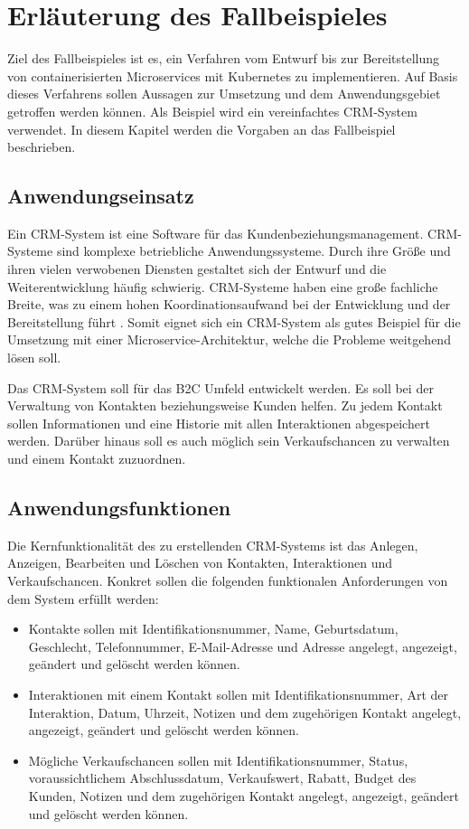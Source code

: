 \section{Erläuterung des Fallbeispieles}
Ziel des Fallbeispieles ist es, ein Verfahren vom Entwurf bis zur Bereitstellung von containerisierten Microservices mit Kubernetes zu implementieren. Auf Basis dieses Verfahrens sollen Aussagen zur Umsetzung und dem Anwendungsgebiet getroffen werden können. Als Beispiel wird ein vereinfachtes \ac{CRM}-System verwendet. In diesem Kapitel werden die Vorgaben an das Fallbeispiel beschrieben.

\subsection{Anwendungseinsatz}
Ein \ac{CRM}-System ist eine Software für das Kundenbeziehungsmanagement. \ac{CRM}-Systeme sind komplexe betriebliche Anwendungssysteme. Durch ihre Größe und ihren vielen verwobenen Diensten gestaltet sich der Entwurf und die Weiterentwicklung häufig schwierig. \ac{CRM}-Systeme haben eine große fachliche Breite, was zu einem hohen Koordinationsaufwand bei der Entwicklung und der Bereitstellung führt \parencite[vgl.][S. 62]{trempArchitekturen2021}. Somit eignet sich ein \ac{CRM}-System als gutes Beispiel für die Umsetzung mit einer Microservice-Architektur, welche die Probleme weitgehend lösen soll. 

Das \ac{CRM}-System soll für das \ac{B2C} Umfeld entwickelt werden. Es soll bei der Verwaltung von Kontakten beziehungsweise Kunden helfen. Zu jedem Kontakt sollen Informationen und eine Historie mit allen Interaktionen abgespeichert werden. Darüber hinaus soll es auch möglich sein Verkaufschancen zu verwalten und einem Kontakt zuzuordnen.

\subsection{Anwendungsfunktionen}
Die Kernfunktionalität des zu erstellenden \ac{CRM}-Systems ist das Anlegen, Anzeigen, Bearbeiten und Löschen von Kontakten, Interaktionen und Verkaufschancen. Konkret sollen die folgenden funktionalen Anforderungen von dem System erfüllt werden:
\begin{itemize}
\item Kontakte sollen mit Identifikationsnummer, Name, Geburtsdatum, Geschlecht, Telefonnummer, E-Mail-Adresse und Adresse angelegt, angezeigt, geändert und gelöscht werden können.
\item Interaktionen mit einem Kontakt sollen mit Identifikationsnummer, Art der Interaktion, Datum, Uhrzeit, Notizen und dem zugehörigen Kontakt angelegt, angezeigt, geändert und gelöscht werden können.
\item Mögliche Verkaufschancen sollen mit Identifikationsnummer, Status, voraussichtlichem Abschlussdatum, Verkaufswert, Rabatt, Budget des Kunden, Notizen und dem zugehörigen Kontakt angelegt, angezeigt, geändert und gelöscht werden können.
\end{itemize} 

